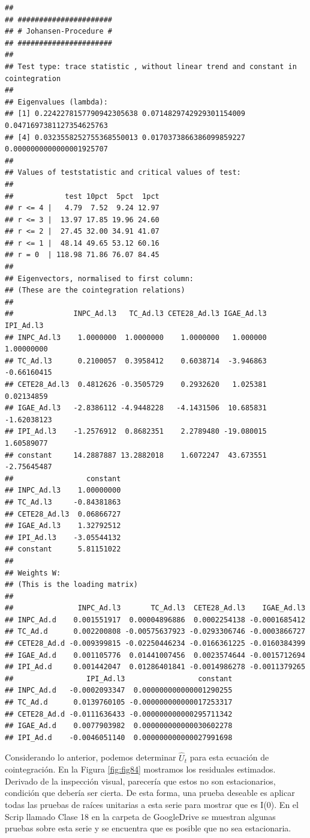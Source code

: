 \documentclass[
]{book}
\begin{document}
\begin{verbatim}
## 
## ###################### 
## # Johansen-Procedure # 
## ###################### 
## 
## Test type: trace statistic , without linear trend and constant in cointegration 
## 
## Eigenvalues (lambda):
## [1] 0.2242278157790942305638 0.0714829742929301154009 0.0471697381127354625763
## [4] 0.0323558252755368550013 0.0170373866386099859227 0.0000000000000001925707
## 
## Values of teststatistic and critical values of test:
## 
##            test 10pct  5pct  1pct
## r <= 4 |   4.79  7.52  9.24 12.97
## r <= 3 |  13.97 17.85 19.96 24.60
## r <= 2 |  27.45 32.00 34.91 41.07
## r <= 1 |  48.14 49.65 53.12 60.16
## r = 0  | 118.98 71.86 76.07 84.45
## 
## Eigenvectors, normalised to first column:
## (These are the cointegration relations)
## 
##              INPC_Ad.l3   TC_Ad.l3 CETE28_Ad.l3 IGAE_Ad.l3   IPI_Ad.l3
## INPC_Ad.l3    1.0000000  1.0000000    1.0000000   1.000000  1.00000000
## TC_Ad.l3      0.2100057  0.3958412    0.6038714  -3.946863 -0.66160415
## CETE28_Ad.l3  0.4812626 -0.3505729    0.2932620   1.025381  0.02134859
## IGAE_Ad.l3   -2.8386112 -4.9448228   -4.1431506  10.685831 -1.62038123
## IPI_Ad.l3    -1.2576912  0.8682351    2.2789480 -19.080015  1.60589077
## constant     14.2887887 13.2882018    1.6072247  43.673551 -2.75645487
##                 constant
## INPC_Ad.l3    1.00000000
## TC_Ad.l3     -0.84381863
## CETE28_Ad.l3  0.06866727
## IGAE_Ad.l3    1.32792512
## IPI_Ad.l3    -3.05544132
## constant      5.81151022
## 
## Weights W:
## (This is the loading matrix)
## 
##               INPC_Ad.l3       TC_Ad.l3  CETE28_Ad.l3    IGAE_Ad.l3
## INPC_Ad.d    0.001551917  0.00004896886  0.0002254138 -0.0001685412
## TC_Ad.d      0.002200808 -0.00575637923 -0.0293306746 -0.0003866727
## CETE28_Ad.d -0.009399815 -0.02250446234 -0.0166361225 -0.0160384399
## IGAE_Ad.d    0.001105776  0.01441007456  0.0023574644 -0.0015712694
## IPI_Ad.d     0.001442047  0.01286401841 -0.0014986278 -0.0011379265
##                 IPI_Ad.l3                 constant
## INPC_Ad.d   -0.0002093347  0.000000000000001290255
## TC_Ad.d      0.0139760105 -0.000000000000017253317
## CETE28_Ad.d -0.0111636433 -0.000000000000295711342
## IGAE_Ad.d    0.0077903982  0.000000000000030602278
## IPI_Ad.d    -0.0046051140  0.000000000000027991698
\end{verbatim}

Considerando lo anterior, podemos determinar \(\hat{U}_t\) para esta
ecuación de cointegración. En la Figura \ref{fig:fig84} mostramos los
residuales estimados. Derivado de la inspección visual, parecería que
estos no son estacionarios, condición que debería ser cierta. De esta
forma, una prueba deseable es aplicar todas las pruebas de raíces
unitarias a esta serie para mostrar que es I(0). En el Scrip llamado
Clase 18 en la carpeta de GoogleDrive se muestran algunas pruebas sobre
esta serie y se encuentra que es posible que no sea estacionaria.
\end{document}

